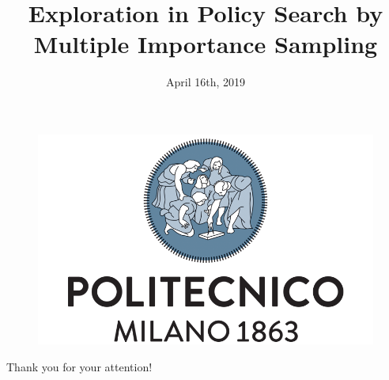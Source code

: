 \documentclass[11.5pt, aspectratio=169]{beamer} %
\title[]{Exploration in Policy Search by Multiple Importance Sampling}
\author[L.\,Lupo]
{%
  \texorpdfstring{
    \begin{columns}%
      \column{1\linewidth}
      \centering
      Lorenzo Lupo\\
      \href{mailto:lorenzo.lupo@mail.polimi.it}{lorenzo.lupo@mail.polimi.it}
    \end{columns}
  }
  {Lorenzo Lupo}
}
\institute[Polimi] %
{%
}
\date{April 16th, 2019}
\begin{document}
\begin{frame}[plain]
	\begin{figure}[htpb]
		\centering
		\includegraphics[width=0.4\linewidth]{Images/polimi_name}
	\end{figure}
	\titlepage
\end{frame}








%
%
%

\begin{frame}[c]{}
  \begin{center}
	  \Huge Thank you for your attention!
  \end{center} 
\end{frame}


\appendix
\backupbegin

\begin{frame}
\frametitle{\refname}
\nocite{*}


\end{frame}

%

\backupend
\end{document}
